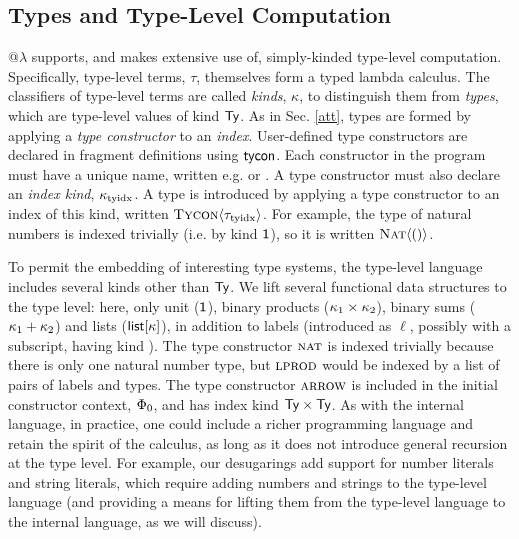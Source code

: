 \subsection{Types and Type-Level Computation}\label{types}
@$\lambda$ supports, and makes extensive use of, simply-kinded type-level computation. Specifically, type-level terms, $\tau$, themselves form a typed lambda calculus. The classifiers of type-level terms are called \emph{kinds}, $\kappa$, to distinguish them from  \emph{types}, which are  type-level values of kind $\textsf{Ty}$. %
As in Sec. \ref{att}, types are formed by applying a \emph{type constructor} to an \emph{index}. User-defined type constructors are declared in fragment definitions using ${\sf tycon}$. Each constructor in the program must have a unique name, written e.g.  or . %
A type constructor must also declare an \emph{index kind}, $\kappa_{\text{tyidx}}$. A type is introduced by applying a type constructor to an index of this kind, written $\textsc{Tycon}\langle{\tau_{\text{tyidx}}}\rangle$.  For example, the type of natural numbers is indexed trivially (i.e. by kind $\textsf{1}$), so it is written $\textsc{Nat}\langle()\rangle$.

 To permit the embedding of interesting type systems, the type-level language includes several kinds other than $\textsf{Ty}$. We lift several functional data structures to the type level: here, only unit ($\textsf{1}$), binary products ($\kappa_1 \times \kappa_2$), binary sums ($\kappa_1 + \kappa_2$) and lists ($\textsf{list}[\kappa]$), in addition to labels (introduced as $\ell$, possibly with a subscript, having kind ).  The type constructor $\textsc{nat}$ is indexed trivially because there is only one natural number type, but $\textsc{lprod}$ would be indexed by a list of pairs of {labels}  and types. The type constructor $\textsc{arrow}$ is included in the initial constructor context, $\Phi_0$, and has index kind $\textsf{Ty} \times \textsf{Ty}$.
 As with the internal language, in practice, one could include a richer programming language and retain the spirit of the calculus, as long as it does not introduce general recursion at the type level. For example, our desugarings add support for number literals and string literals, which require adding numbers and strings to the type-level language (and providing a means for lifting them from the type-level language to the internal language, as we will discuss).
  
